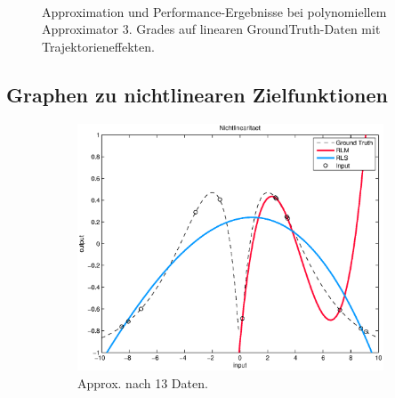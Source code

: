 \documentclass[a4paper, 12pt]{article}
\begin{document}
{\begin{figure}[H]
\begin{subfigure}[b]{0.4\textwidth}
                \caption{}
                \label{fig:apx:trajektorien3:perf}
        \end{subfigure}
        \\
        \caption{Approximation und Performance-Ergebnisse bei polynomiellem Approximator 3. Grades auf linearen GroundTruth-Daten mit Trajektorieneffekten.}
        \label{fig:apx:trajektorien3}
\end{figure}

\subsection{Graphen zu nichtlinearen Zielfunktionen}
\label{apx:nichtlinear}
\begin{figure}[H]
        \centering
        \begin{subfigure}[b]{0.3\textwidth}
                \centering
                \includegraphics[width=\textwidth]{./images/copyofstats/nonlin3_approx_13.eps}
                \caption{Approx. nach 13 Daten.}
                \label{fig:apx:nichtlinear:approx13}
        \end{subfigure}
        \begin{subfigure}[b]{0.3\textwidth}
                \centering

\end{subfigure}
\end{figure}}
\end{document}

